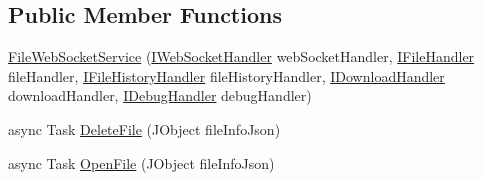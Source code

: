 \subsection*{Public Member Functions}
\begin{DoxyCompactItemize}
\item 
\mbox{\hyperlink{class_little_weeb_library_1_1_services_1_1_file_web_socket_service_a06fb16d6cce4fdc44878a384ad85efc4}{File\+Web\+Socket\+Service}} (\mbox{\hyperlink{interface_little_weeb_library_1_1_handlers_1_1_i_web_socket_handler}{I\+Web\+Socket\+Handler}} web\+Socket\+Handler, \mbox{\hyperlink{interface_little_weeb_library_1_1_handlers_1_1_i_file_handler}{I\+File\+Handler}} file\+Handler, \mbox{\hyperlink{interface_little_weeb_library_1_1_handlers_1_1_i_file_history_handler}{I\+File\+History\+Handler}} file\+History\+Handler, \mbox{\hyperlink{interface_little_weeb_library_1_1_handlers_1_1_i_download_handler}{I\+Download\+Handler}} download\+Handler, \mbox{\hyperlink{interface_little_weeb_library_1_1_handlers_1_1_i_debug_handler}{I\+Debug\+Handler}} debug\+Handler)
\item 
async Task \mbox{\hyperlink{class_little_weeb_library_1_1_services_1_1_file_web_socket_service_ab1375e8e82a50dfa06d91bebe988d133}{Delete\+File}} (J\+Object file\+Info\+Json)
\item 
async Task \mbox{\hyperlink{class_little_weeb_library_1_1_services_1_1_file_web_socket_service_ae140d076e6f64585e7b71bb51545e1bb}{Open\+File}} (J\+Object file\+Info\+Json)
\end{DoxyCompactItemize}
